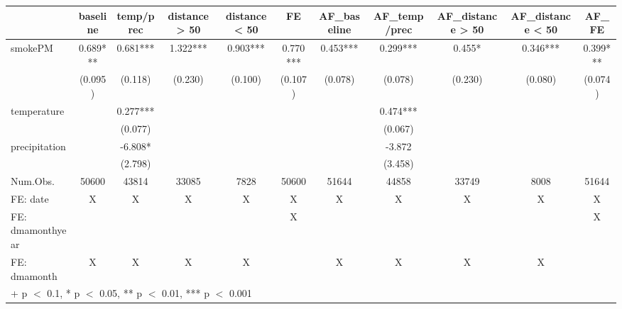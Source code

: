 \begin{table}
\centering
\begin{tabular}[t]{lcccccccccc}
\toprule
  & baseline & temp/prec & distance > 50 & distance < 50 & FE & AF\_baseline & AF\_temp/prec & AF\_distance > 50 & AF\_distance < 50 & AF\_FE\\
\midrule
smokePM & 0.689*** & 0.681*** & 1.322*** & 0.903*** & 0.770*** & 0.453*** & 0.299*** & 0.455* & 0.346*** & 0.399***\\
 & (0.095) & (0.118) & (0.230) & (0.100) & (0.107) & (0.078) & (0.078) & (0.230) & (0.080) & (0.074)\\
temperature &  & 0.277*** &  &  &  &  & 0.474*** &  &  & \\
 &  & (0.077) &  &  &  &  & (0.067) &  &  & \\
precipitation &  & -6.808* &  &  &  &  & -3.872 &  &  & \\
 &  & (2.798) &  &  &  &  & (3.458) &  &  & \\
\midrule
Num.Obs. & 50600 & 43814 & 33085 & 7828 & 50600 & 51644 & 44858 & 33749 & 8008 & 51644\\
FE: date & X & X & X & X & X & X & X & X & X & X\\
FE: dmamonthyear &  &  &  &  & X &  &  &  &  & X\\
FE: dmamonth & X & X & X & X &  & X & X & X & X & \\
\bottomrule
\multicolumn{11}{l}{\rule{0pt}{1em}+ p $<$ 0.1, * p $<$ 0.05, ** p $<$ 0.01, *** p $<$ 0.001}\\
\end{tabular}
\end{table}
